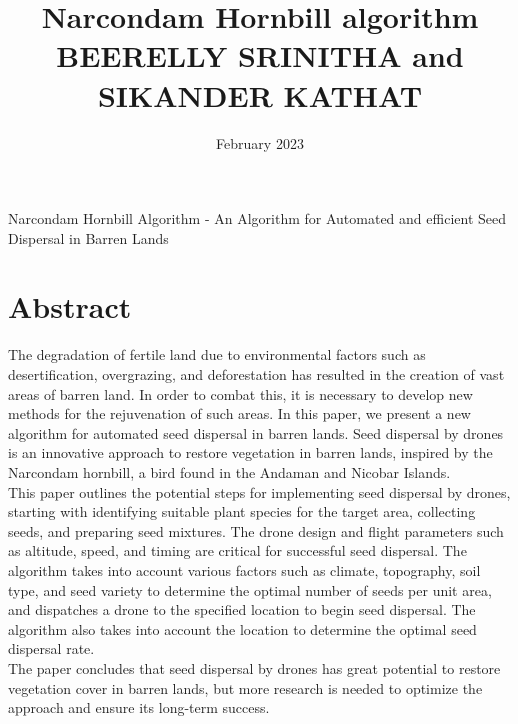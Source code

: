 \documentclass[pmlr,twocolumn,10pt]{jmlr}
\title{Narcondam Hornbill algorithm
\\
BEERELLY SRINITHA and SIKANDER KATHAT}
\author{ }
\date{February 2023}
\begin{document}
\maketitle
\begin{center}
Narcondam Hornbill Algorithm -
An Algorithm for Automated and efficient Seed Dispersal in Barren Lands
\end{center}
\section*{Abstract}
The degradation of fertile land due to environmental factors such as desertification, overgrazing, and deforestation has resulted in the creation of vast areas of barren land. In order to combat this, it is necessary to develop new methods for the rejuvenation of such areas. In this paper, we present a new algorithm for automated seed dispersal in barren lands. Seed dispersal by drones is an innovative approach to restore vegetation in barren lands, inspired by the Narcondam hornbill, a bird found in the Andaman and Nicobar Islands. 
\\This paper outlines the potential steps for implementing seed dispersal by drones, starting with identifying suitable plant species for the target area, collecting seeds, and preparing seed mixtures. The drone design and flight parameters such as altitude, speed, and timing are critical for successful seed dispersal. The algorithm takes into account various factors such as climate, topography, soil type, and seed variety to determine the optimal number of seeds per unit area, and dispatches a drone to the specified location to begin seed dispersal. The algorithm also takes into account the location to determine the optimal seed dispersal rate.
\\The paper concludes that seed dispersal by drones has great potential to restore vegetation cover in barren lands, but more research is needed to optimize the approach and ensure its long-term success.
\end{document}

